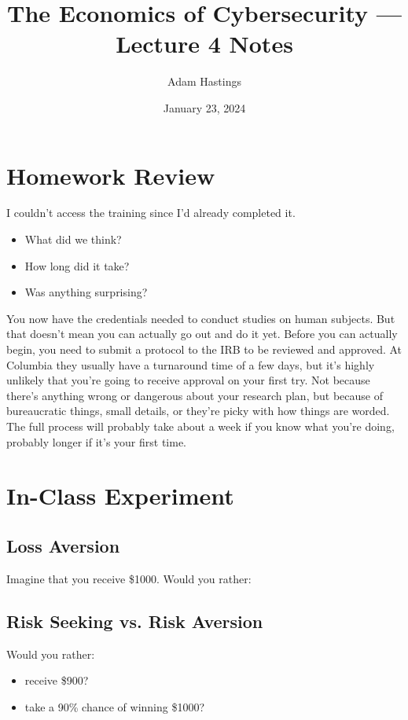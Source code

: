 \documentclass[11pt]{article}
\title{The Economics of Cybersecurity --- Lecture 4 Notes}
\date{January 23, 2024}
\author{Adam Hastings}
\begin{document}
\maketitle

\section{Homework Review}

I couldn't access the training since I'd already completed it. 
\begin{itemize}
    \item What did we think?
    \item How long did it take?
    \item Was anything surprising?
\end{itemize}

You now have the credentials needed to conduct studies on human subjects. 
But that doesn't mean you can actually go out and do it yet. 
Before you can actually begin, you need to submit a protocol to the IRB to be reviewed and approved.
At Columbia they usually have a turnaround time of a few days, but it's highly unlikely that you're going to receive approval on your first try. 
Not because there's anything wrong or dangerous about your research plan, but because of bureaucratic things, small details, or they're picky with how things are worded.
The full process will probably take about a week if you know what you're doing, probably longer if it's your first time.

\section{In-Class Experiment}

\subsection{Loss Aversion}

Imagine that you receive \$1000. Would you rather:




\subsection{Risk Seeking vs. Risk Aversion}

Would you rather:
\begin{itemize}
    \item receive \$900?
    \item take a 90\% chance of winning \$1000?
\end{itemize}
\end{document}
